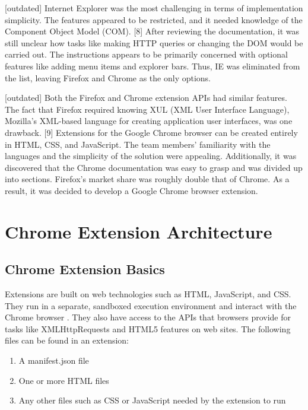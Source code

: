 [outdated] Internet Explorer was the most challenging in terms of implementation simplicity. The features appeared to be restricted, and it needed knowledge of the Component Object Model (COM). [8] After reviewing the documentation, it was still unclear how tasks like making HTTP queries or changing the DOM would be carried out. The instructions appears to be primarily concerned with optional features like adding menu items and explorer bars. Thus, IE was eliminated from the list, leaving Firefox and Chrome as the only options.

[outdated] Both the Firefox and Chrome extension APIs had similar features. The fact that Firefox required knowing XUL (XML User Interface Language), Mozilla's XML-based language for creating application user interfaces, was one drawback. [9] Extensions for the Google Chrome browser can be created entirely in HTML, CSS, and JavaScript. The team members' familiarity with the languages and the simplicity of the solution were appealing. Additionally, it was discovered that the Chrome documentation was easy to grasp and was divided up into sections. Firefox's market share was roughly double that of Chrome. As a result, it was decided to develop a Google Chrome browser extension.


\section{Chrome Extension Architecture}

\subsection{Chrome Extension Basics}

Extensions are built on web technologies such as HTML, JavaScript, and CSS. They run in a separate, sandboxed execution environment and interact with the Chrome browser \autocite{google2021what}. They also have access to the APIs that browsers provide for tasks like XMLHttpRequests and HTML5 features on web sites. The following files can be found in an extension:

\begin{enumerate}
 \item A manifest.json file
 \item One or more HTML files
 \item Any other files such as CSS or JavaScript needed by the extension to run
\end{enumerate}

